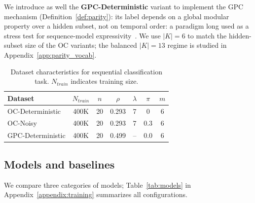 \documentclass{article}
\theoremstyle{plain}
\theoremstyle{definition}
\theoremstyle{remark}
\begin{document}
We introduce as well the \textbf{GPC-Deterministic} variant to implement the GPC mechanism (Definition~\ref{def:parity}): its label depends on a global modular property over a hidden subset, not on temporal order: a paradigm long used as a stress test for sequence-model expressivity~\citep{hahn-2020-theoretical}. We use $|K|=6$ to match the hidden-subset size of the OC variants; the balanced $|K|=13$ regime is studied in Appendix~\ref{app:parity_vocab}.




\begin{table}[h]
\centering
\caption{Dataset characteristics for sequential classification task. $N_{train}$ indicates training size.}
\label{tab:datasets}
\begin{tabular}{lcccccc}
\toprule
Dataset & $N_{train}$ & $n$ & $\rho$ & $\lambda$ & $\pi$ & $m$ \\
\midrule
OC-Deterministic    & 400K & 20 & 0.293 & 7 & 0 & 6 \\
OC-Noisy  & 400K & 20 & 0.293 & 7 & 0.3        & 6 \\
GPC-Deterministic         & 400K & 20 & 0.499 & --& 0.0        & 6 \\
\bottomrule
\end{tabular}
\end{table}

\subsection{Models and baselines}
\label{subsec:models}

We compare three categories of models; Table~\ref{tab:models} in Appendix~\ref{appendix:training} summarizes all configurations.
\end{document}
